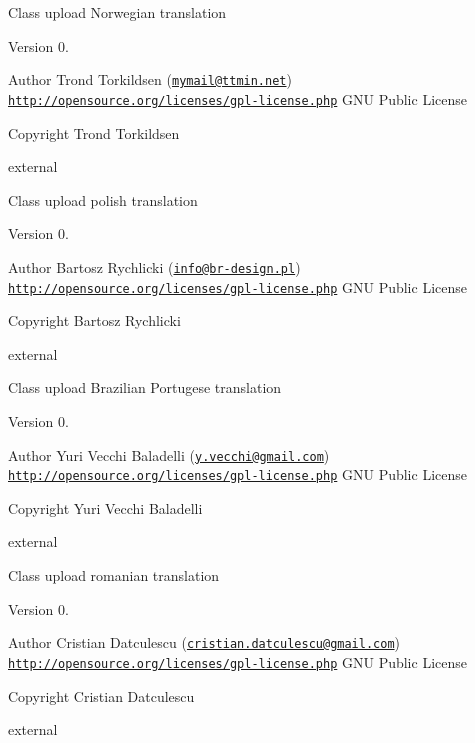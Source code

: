 Class upload Norwegian translation

\begin{DoxyVersion}{Version}
0. 
\end{DoxyVersion}
\begin{DoxyAuthor}{Author}
Trond Torkildsen (\href{mailto:mymail@ttmin.net}{\tt mymail@ttmin.\+net})  \href{http://opensource.org/licenses/gpl-license.php}{\tt http\+://opensource.\+org/licenses/gpl-\/license.\+php} G\+N\+U Public License 
\end{DoxyAuthor}
\begin{DoxyCopyright}{Copyright}
Trond Torkildsen
\end{DoxyCopyright}
external

Class upload polish translation

\begin{DoxyVersion}{Version}
0. 
\end{DoxyVersion}
\begin{DoxyAuthor}{Author}
Bartosz Rychlicki (\href{mailto:info@br-design.pl}{\tt info@br-\/design.\+pl})  \href{http://opensource.org/licenses/gpl-license.php}{\tt http\+://opensource.\+org/licenses/gpl-\/license.\+php} G\+N\+U Public License 
\end{DoxyAuthor}
\begin{DoxyCopyright}{Copyright}
Bartosz Rychlicki
\end{DoxyCopyright}
external

Class upload Brazilian Portugese translation

\begin{DoxyVersion}{Version}
0. 
\end{DoxyVersion}
\begin{DoxyAuthor}{Author}
Yuri Vecchi Baladelli (\href{mailto:y.vecchi@gmail.com}{\tt y.\+vecchi@gmail.\+com})  \href{http://opensource.org/licenses/gpl-license.php}{\tt http\+://opensource.\+org/licenses/gpl-\/license.\+php} G\+N\+U Public License 
\end{DoxyAuthor}
\begin{DoxyCopyright}{Copyright}
Yuri Vecchi Baladelli
\end{DoxyCopyright}
external

Class upload romanian translation

\begin{DoxyVersion}{Version}
0. 
\end{DoxyVersion}
\begin{DoxyAuthor}{Author}
Cristian Datculescu (\href{mailto:cristian.datculescu@gmail.com}{\tt cristian.\+datculescu@gmail.\+com})  \href{http://opensource.org/licenses/gpl-license.php}{\tt http\+://opensource.\+org/licenses/gpl-\/license.\+php} G\+N\+U Public License 
\end{DoxyAuthor}
\begin{DoxyCopyright}{Copyright}
Cristian Datculescu
\end{DoxyCopyright}
external

